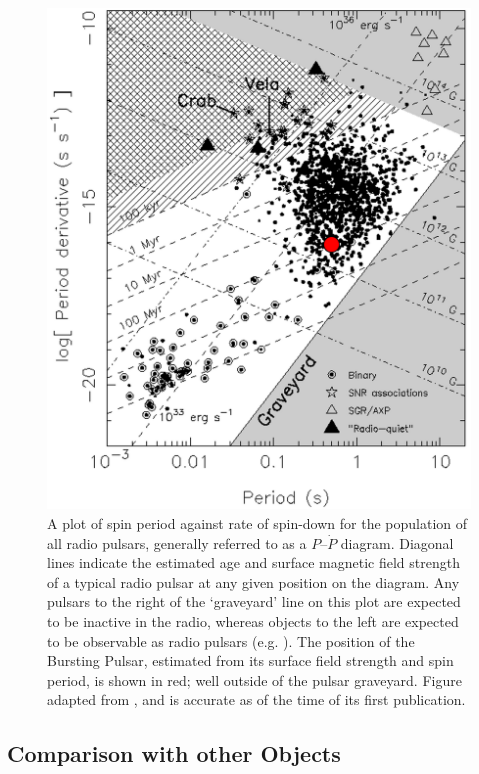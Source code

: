 \begin{figure}
 \centering
 \includegraphics[width=.82\linewidth, trim={0cm 0cm 0cm 0cm},clip]{images/ppdot.png}
 \caption[A plot of spin period against rate of spin-down for the population of all known radio pulsars, a so-called $P$--$\dot{P}$ diagram, showing where the Bursting Pulsar lies in this parameter space and indicating that it lies well outside of the pulsar `graveyard'.]{A plot of spin period against rate of spin-down for the population of all radio pulsars, generally referred to as a $P$--$\dot{P}$ diagram.  Diagonal lines indicate the estimated age and surface magnetic field strength of a typical radio pulsar at any given position on the diagram.  Any pulsars to the right of the `graveyard' line on this plot are expected to be inactive in the radio, whereas objects to the left are expected to be observable as radio pulsars (e.g. \citealp{vandenHeuvel_Graveyard}).  The position of the Bursting Pulsar, estimated from its surface field strength and spin period, is shown in red; well outside of the pulsar graveyard.  Figure adapted from \citet{Lorimer_Handbook}, and is accurate as of the time of its first publication.}
 \label{fig:graveyard}
\end{figure}

\subsection{Comparison with other Objects}

